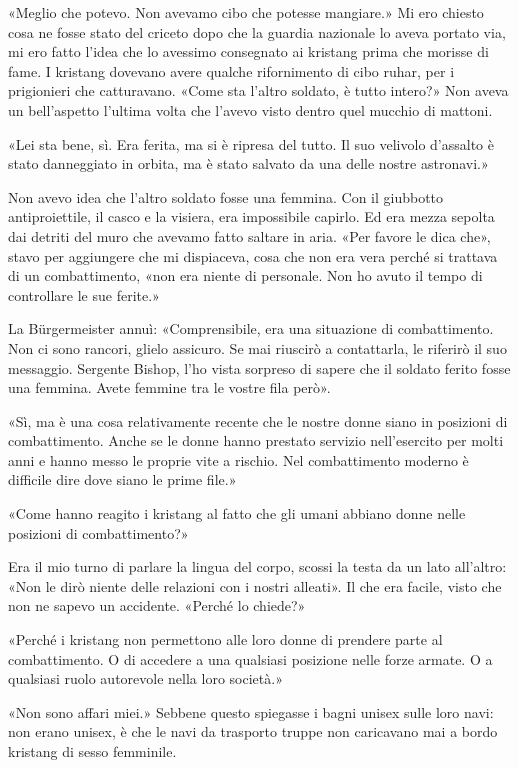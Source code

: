 «Meglio che potevo. Non avevamo cibo che potesse mangiare.» Mi ero
chiesto cosa ne fosse stato del criceto dopo che la guardia nazionale lo
aveva portato via, mi ero fatto l'idea che lo avessimo consegnato ai
kristang prima che morisse di fame. I kristang dovevano avere qualche
rifornimento di cibo ruhar, per i prigionieri che catturavano. «Come sta
l'altro soldato, è tutto intero?» Non aveva un bell'aspetto l'ultima
volta che l'avevo visto dentro quel mucchio di mattoni.

«Lei sta bene, sì. Era ferita, ma si è ripresa del tutto. Il suo
velivolo d'assalto è stato danneggiato in orbita, ma è stato salvato da
una delle nostre astronavi.»

Non avevo idea che l'altro soldato fosse una femmina. Con il giubbotto
antiproiettile, il casco e la visiera, era impossibile capirlo. Ed era
mezza sepolta dai detriti del muro che avevamo fatto saltare in aria.
«Per favore le dica che», stavo per aggiungere che mi dispiaceva, cosa
che non era vera perché si trattava di un combattimento, «non era niente
di personale. Non ho avuto il tempo di controllare le sue ferite.»

La Bürgermeister annuì: «Comprensibile, era una situazione di
combattimento. Non ci sono rancori, glielo assicuro. Se mai riuscirò a
contattarla, le riferirò il suo messaggio. Sergente Bishop, l'ho vista
sorpreso di sapere che il soldato ferito fosse una femmina. Avete
femmine tra le vostre fila però».

«Sì, ma è una cosa relativamente recente che le nostre donne siano in
posizioni di combattimento. Anche se le donne hanno prestato servizio
nell'esercito per molti anni e hanno messo le proprie vite a rischio.
Nel combattimento moderno è difficile dire dove siano le prime file.»

«Come hanno reagito i kristang al fatto che gli umani abbiano donne
nelle posizioni di combattimento?»

Era il mio turno di parlare la lingua del corpo, scossi la testa da un
lato all'altro: «Non le dirò niente delle relazioni con i nostri
alleati». Il che era facile, visto che non ne sapevo un accidente.
«Perché lo chiede?»

«Perché i kristang non permettono alle loro donne di prendere parte al
combattimento. O di accedere a una qualsiasi posizione nelle forze
armate. O a qualsiasi ruolo autorevole nella loro società.»

«Non sono affari miei.» Sebbene questo spiegasse i bagni unisex sulle
loro navi: non erano unisex, è che le navi da trasporto truppe non
caricavano mai a bordo kristang di sesso femminile.

